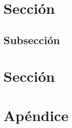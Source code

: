 \documentclass[12pt, letterpaper]{article}
\title{\doctitle}
\author{Autor}
\date{\monthname[\month] de \the\year}
\begin{document}
\pagestyle{fancy}

\maketitle

\newpage
\tableofcontents

\newpage
\section{Sección}
\lipsum[1-2]
\cite{knuth1984}

\subsection{Subsección}
\lipsum[3]

\section{Sección}
\lipsum[1-2]
\newpage

\printbibliography
{}

\appendix
\section{Apéndice}
\lipsum[4-5]
\end{document}
